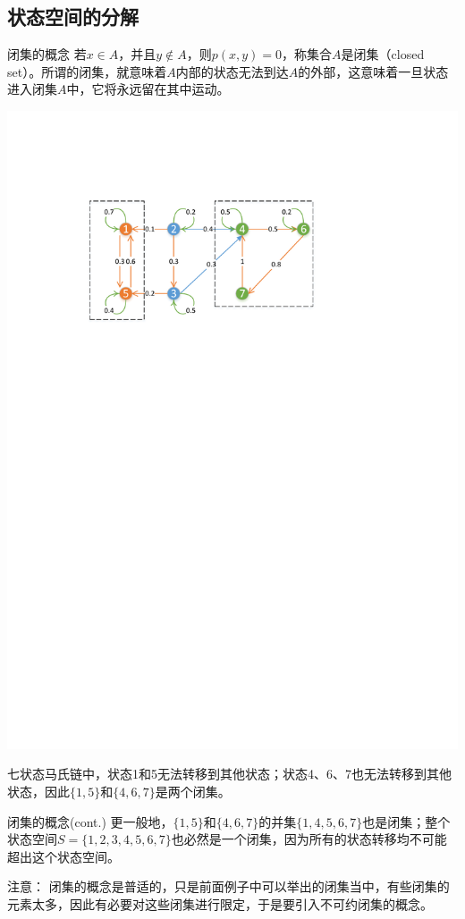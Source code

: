 \documentclass[t]{beamer}
\begin{document}
\subsection{状态空间的分解}
\begin{frame}{闭集的概念}
    若$x\in A$，并且$y\notin A$，则$p(x,y)=0$，称集合$A$是闭集（closed set）。所谓的闭集，就意味着$A$内部的状态无法到达$A$的外部，这意味着一旦状态进入闭集$A$中，它将永远留在其中运动。
    \begin{center}
		\includegraphics[scale=.5]{fig/markov2.pdf}
    \end{center}

    七状态马氏链中，状态1和5无法转移到其他状态；状态4、6、7也无法转移到其他状态，因此$\{1,5\}$和$\{4,6,7\}$是两个闭集。
\end{frame}


\begin{frame}{闭集的概念(cont.)}
更一般地，$\{1,5\}$和$\{4,6,7\}$的并集$\{1,4,5,6,7\}$也是闭集；整个状态空间$S=\{1,2,3,4,5,6,7\}$也必然是一个闭集，因为所有的状态转移均不可能超出这个状态空间。

\begin{block}{注意：}
    闭集的概念是普适的，只是前面例子中可以举出的闭集当中，有些闭集的元素太多，因此有必要对这些闭集进行限定，于是要引入不可约闭集的概念。
\end{block}
\end{frame}
\end{document}
